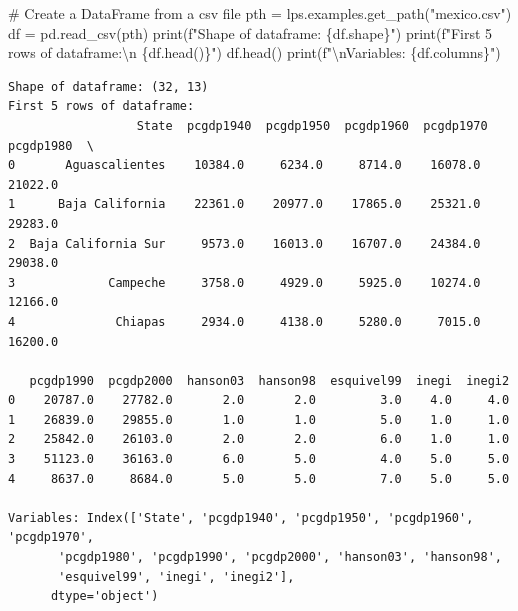 \documentclass[
  a4paper, 
  twoside,
  final
]{article}
\newenvironment{Shaded}{\begin{snugshade}}{\end{snugshade}}
\newcommand{\BuiltInTok}[1]{\textcolor[rgb]{0.00,0.23,0.31}{#1}}
\newcommand{\CharTok}[1]{\textcolor[rgb]{0.13,0.47,0.30}{#1}}
\newcommand{\CommentTok}[1]{\textcolor[rgb]{0.37,0.37,0.37}{#1}}
\newcommand{\NormalTok}[1]{\textcolor[rgb]{0.00,0.23,0.31}{#1}}
\newcommand{\OperatorTok}[1]{\textcolor[rgb]{0.37,0.37,0.37}{#1}}
\newcommand{\SpecialCharTok}[1]{\textcolor[rgb]{0.37,0.37,0.37}{#1}}
\newcommand{\SpecialStringTok}[1]{\textcolor[rgb]{0.13,0.47,0.30}{#1}}
\newcommand{\StringTok}[1]{\textcolor[rgb]{0.13,0.47,0.30}{#1}}
\begin{document}
\begin{Shaded}
\begin{Highlighting}[]
\CommentTok{\# Create a DataFrame from a csv file}
\NormalTok{pth }\OperatorTok{=}\NormalTok{ lps.examples.get\_path(}\StringTok{"mexico.csv"}\NormalTok{)}
\NormalTok{df }\OperatorTok{=}\NormalTok{ pd.read\_csv(pth)}
\BuiltInTok{print}\NormalTok{(}\SpecialStringTok{f"Shape of dataframe: }\SpecialCharTok{\{}\NormalTok{df}\SpecialCharTok{.}\NormalTok{shape}\SpecialCharTok{\}}\SpecialStringTok{"}\NormalTok{)}
\BuiltInTok{print}\NormalTok{(}\SpecialStringTok{f"First 5 rows of dataframe:}\CharTok{\textbackslash{}n}\SpecialStringTok{ }\SpecialCharTok{\{}\NormalTok{df}\SpecialCharTok{.}\NormalTok{head()}\SpecialCharTok{\}}\SpecialStringTok{"}\NormalTok{)}
\NormalTok{df.head()}
\BuiltInTok{print}\NormalTok{(}\SpecialStringTok{f"}\CharTok{\textbackslash{}n}\SpecialStringTok{Variables: }\SpecialCharTok{\{}\NormalTok{df}\SpecialCharTok{.}\NormalTok{columns}\SpecialCharTok{\}}\SpecialStringTok{"}\NormalTok{)}
\end{Highlighting}
\end{Shaded}

\begin{verbatim}
Shape of dataframe: (32, 13)
First 5 rows of dataframe:
                  State  pcgdp1940  pcgdp1950  pcgdp1960  pcgdp1970  pcgdp1980  \
0       Aguascalientes    10384.0     6234.0     8714.0    16078.0    21022.0   
1      Baja California    22361.0    20977.0    17865.0    25321.0    29283.0   
2  Baja California Sur     9573.0    16013.0    16707.0    24384.0    29038.0   
3             Campeche     3758.0     4929.0     5925.0    10274.0    12166.0   
4              Chiapas     2934.0     4138.0     5280.0     7015.0    16200.0   

   pcgdp1990  pcgdp2000  hanson03  hanson98  esquivel99  inegi  inegi2  
0    20787.0    27782.0       2.0       2.0         3.0    4.0     4.0  
1    26839.0    29855.0       1.0       1.0         5.0    1.0     1.0  
2    25842.0    26103.0       2.0       2.0         6.0    1.0     1.0  
3    51123.0    36163.0       6.0       5.0         4.0    5.0     5.0  
4     8637.0     8684.0       5.0       5.0         7.0    5.0     5.0  

Variables: Index(['State', 'pcgdp1940', 'pcgdp1950', 'pcgdp1960', 'pcgdp1970',
       'pcgdp1980', 'pcgdp1990', 'pcgdp2000', 'hanson03', 'hanson98',
       'esquivel99', 'inegi', 'inegi2'],
      dtype='object')
\end{verbatim}
\end{document}

